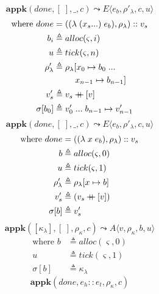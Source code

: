 \documentclass[12pt,draft]{article}
\newcommand\mdoubleplus{\ensuremath{\mathbin{+\mkern-9mu+}}}
\newcommand{\lamsyn}[2]{(\lambda\;(#1 ...)\;#2)}
\newcommand{\vararglamsyn}[2]{(\lambda\;#1\;#2)}
\begin{document}
\begin{multicols*}{2}
\vfill\null
\columnbreak


\[
\textbf{appk}(done, [\;], \_, c)
\leadsto
E\langle
e_b , \rho'_{\lambda} , c , u
\rangle
\]
\vspace{-11mm}
\begin{align*}
\text{where } done &= (\lamsyn{x_s}{e_b}, \rho_{\lambda}) :: v_s \\
b_i &\triangleq alloc(\varsigma, i) \\
u &\triangleq tick(\varsigma, n) \\
\rho'_{\lambda} &\triangleq \rho_{\lambda}[x_0 \mapsto b_0 \;... \\
&\;\;\;\;\;\;\;\;\;x_{n-1} \mapsto b_{n-1}] \\
v'_s &\triangleq v_s \mdoubleplus [v] \\
\sigma[b_0] &\triangleq v'_0 \;...\; b_{n-1} \mapsto v'_{n-1}
\end{align*}
\[
\textbf{appk}(done, [\;], \_, c)
\leadsto
E\langle
e_b , \rho'_{\lambda} , c , u
\rangle
\]
\vspace{-9mm}
\begin{align*}
\text{where } done &= (\vararglamsyn{x}{e_b}, \rho_{\lambda}) :: v_s \\
b &\triangleq alloc(\varsigma, 0) \\
u &\triangleq tick(\varsigma, 1) \\
\rho'_{\lambda} &\triangleq \rho_{\lambda}[x \mapsto b] \\
v'_s &\triangleq (v_s \mdoubleplus [v]) \\
\sigma[b] &\triangleq v'_s
\end{align*}
\[
\textbf{appk}([\kappa_{\lambda}], [\;], \rho_{\kappa}, c)
\leadsto
A\langle
v , \rho_{\kappa} , b , u
\rangle
\]
\vspace{-10mm}
\begin{align*}
\text{where } b &\triangleq alloc(\varsigma, 0) \\
u &\triangleq tick(\varsigma, 1) \\
\sigma[b] &\triangleq \kappa_{\lambda}
\end{align*}
\[
\textbf{appk}(done, e_h::e_t, \rho_{\kappa}, c)
\]
\end{multicols*}
\end{document}
